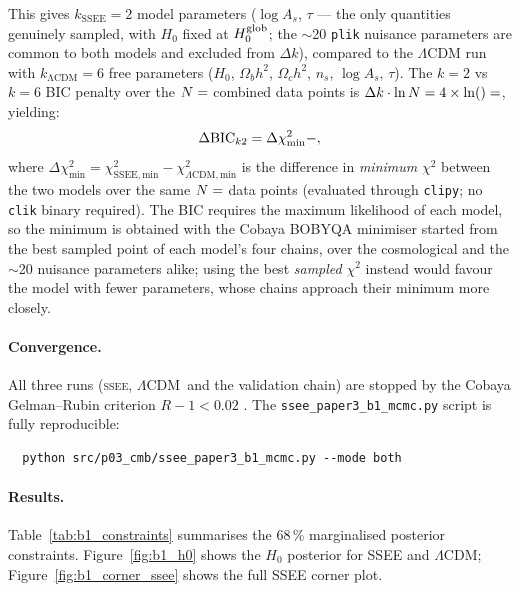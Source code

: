 \documentclass[12pt,a4paper]{article}
\newcommand{\SSEE}{\ifmmode\mathrm{SSEE}\else\textsc{ssee}\fi}
\newcommand{\LCDM}{\ifmmode\Lambda\mathrm{CDM}\else$\Lambda$CDM\fi}
\begin{document}
This gives $k_\mathrm{SSEE} = 2$ model parameters ($\log A_s$, $\tau$ --- the only quantities genuinely sampled, with $H_0$ fixed at $H_0^{\rm glob}$; the $\sim$20 \texttt{plik} nuisance parameters are common to both models and excluded from $\Delta k$), compared to the $\Lambda$CDM run with $k_\mathrm{\Lambda CDM} = 6$ free parameters ($H_0$, $\Omega_b h^2$, $\Omega_c h^2$, $n_s$, $\log A_s$, $\tau$). The $k=2$ vs $k=6$ BIC penalty over the $N=\val{b1_N}$ combined data points is $\Delta k \cdot \ln N = 4 \times \ln(\val{b1_N}) = \val{b1_penal}$, yielding:
\begin{equation}
    \label{eq:bic_b1}
    \Delta\mathrm{BIC}_{k2} = \Delta\chi^2_\mathrm{min} - \val{b1_penal},
\end{equation}
where $\Delta\chi^2_\mathrm{min} = \chi^2_{\mathrm{SSEE,min}} - \chi^2_{\Lambda\mathrm{CDM,min}}$ is the difference in \emph{minimum} $\chi^2$ between the two models over the same $N=\val{b1_N}$ data points (evaluated through \texttt{clipy}; no \texttt{clik} binary required). The BIC requires the maximum likelihood of each model, so the minimum is obtained with the Cobaya BOBYQA minimiser started from the best sampled point of each model's four chains, over the cosmological and the $\sim$20 nuisance parameters alike; using the best \emph{sampled} $\chi^2$ instead would favour the model with fewer parameters, whose chains approach their minimum more closely.

\paragraph{Convergence.}
All three runs (\SSEE, \LCDM\ and the validation chain) are stopped by the Cobaya Gelman--Rubin criterion $R{-}1 < 0.02$ \citep{GelmanRubin1992}. The \texttt{ssee\_paper3\_b1\_mcmc.py} script is fully reproducible:
\begin{verbatim}
  python src/p03_cmb/ssee_paper3_b1_mcmc.py --mode both
\end{verbatim}

\paragraph{Results.}
Table~\ref{tab:b1_constraints} summarises the 68\,\% marginalised posterior constraints. Figure~\ref{fig:b1_h0} shows the $H_0$ posterior for SSEE and $\Lambda$CDM; Figure~\ref{fig:b1_corner_ssee} shows the full SSEE corner plot.
\end{document}
